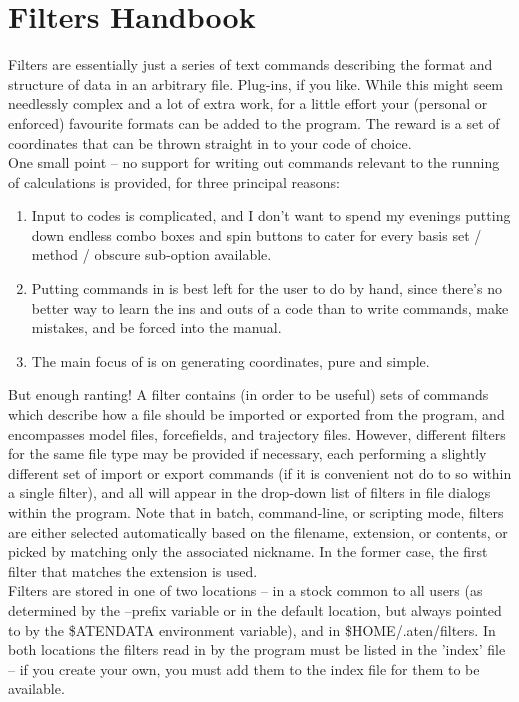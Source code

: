 \chapter{Filters Handbook}
\label{sec:filterhandbook}

Filters are essentially just a series of text commands describing the format and structure of data in an arbitrary file. Plug-ins, if you like. While this might seem needlessly complex and a lot of extra work, for a little effort your (personal or enforced) favourite formats can be added to the program. The reward is a set of coordinates that can be thrown straight in to your code of choice. \\

One small point -- no support for writing out commands relevant to the running of calculations is provided, for three principal reasons:

\begin{enumerate}
	\item Input to codes is complicated, and I don't want to spend my evenings putting down endless combo boxes and spin buttons to cater for every basis set / method / obscure sub-option available.
	\item Putting commands in is best left for the user to do by hand, since there's no better way to learn the ins and outs of a code than to write commands, make mistakes, and be forced into the manual.
	\item The main focus of \progname{} is on generating coordinates, pure and simple.
\end{enumerate}

But enough ranting! A filter contains (in order to be useful) sets of commands which describe how a file should be imported or exported from the program, and encompasses model files, forcefields, and trajectory files. However, different filters for the same file type may be provided if necessary, each performing a slightly different set of import or export commands (if it is convenient not do to so within a single filter), and all will appear in the drop-down list of filters in file dialogs within the program. Note that in batch, command-line, or scripting mode, filters are either selected automatically based on the filename, extension, or contents, or picked by matching only the associated nickname. In the former case, the first filter that matches the extension is used.\\

Filters are stored in one of two locations -- in a stock common to all users (as determined by the --prefix variable or in the default location, but always pointed to by the \$ATENDATA environment variable), and in \$HOME/.aten/filters. In both locations the filters read in by the program must be listed in the 'index' file -- if you create your own, you must add them to the index file for them to be available.\\

